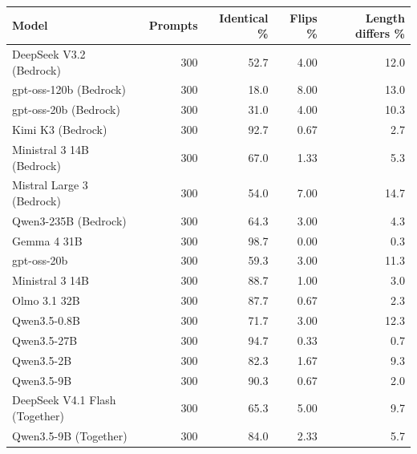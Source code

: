 \begin{tabular}{lrrrr}
  \toprule
  Model & Prompts & Identical \% & Flips \% & Length differs \% \\
  \midrule
  DeepSeek V3.2 (Bedrock) & 300 & 52.7 & 4.00 & 12.0 \\
  gpt-oss-120b (Bedrock) & 300 & 18.0 & 8.00 & 13.0 \\
  gpt-oss-20b (Bedrock) & 300 & 31.0 & 4.00 & 10.3 \\
  Kimi K3 (Bedrock) & 300 & 92.7 & 0.67 & 2.7 \\
  Ministral 3 14B (Bedrock) & 300 & 67.0 & 1.33 & 5.3 \\
  Mistral Large 3 (Bedrock) & 300 & 54.0 & 7.00 & 14.7 \\
  Qwen3-235B (Bedrock) & 300 & 64.3 & 3.00 & 4.3 \\
  Gemma 4 31B & 300 & 98.7 & 0.00 & 0.3 \\
  gpt-oss-20b & 300 & 59.3 & 3.00 & 11.3 \\
  Ministral 3 14B & 300 & 88.7 & 1.00 & 3.0 \\
  Olmo 3.1 32B & 300 & 87.7 & 0.67 & 2.3 \\
  Qwen3.5-0.8B & 300 & 71.7 & 3.00 & 12.3 \\
  Qwen3.5-27B & 300 & 94.7 & 0.33 & 0.7 \\
  Qwen3.5-2B & 300 & 82.3 & 1.67 & 9.3 \\
  Qwen3.5-9B & 300 & 90.3 & 0.67 & 2.0 \\
  DeepSeek V4.1 Flash (Together) & 300 & 65.3 & 5.00 & 9.7 \\
  Qwen3.5-9B (Together) & 300 & 84.0 & 2.33 & 5.7 \\
  \bottomrule
\end{tabular}
